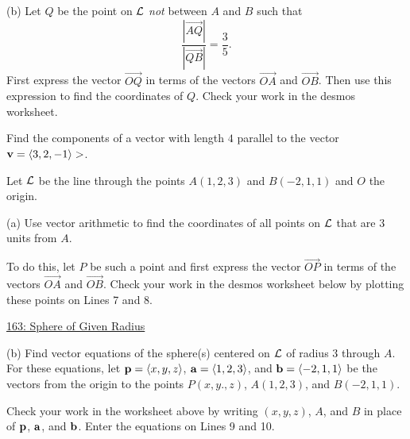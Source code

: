 \documentclass{ximera}
\begin{document}
\begin{question}
\begin{explanation}
\end{explanation}


(b) Let $Q$ be the point on ${\cal L}$ \emph{not} between $A$ and $B$ such that
\[
      \frac{|\overrightarrow{AQ}|}{|\overrightarrow{QB}|} = \frac{3}{5} . 
\]
First express the vector $\overrightarrow{OQ}$ in terms of the vectors $\overrightarrow{OA}$ and $\overrightarrow{OB}$. Then use this expression to find the coordinates of $Q$. Check your work in the desmos worksheet.


\end{question}

\begin{question}  \label{Q:98dfer3vv}
Find the components of a vector with length $4$ parallel to the vector ${\bf v}=\langle 3, 2, -1\rangle>$.
\end{question}

\begin{question}  \label{QP9erf333}
Let ${\cal L}$ be the line through the points $A(1,2,3)$ and $B(-2,1,1)$ and $O$ the origin.

(a) Use vector arithmetic to find the coordinates of all points on ${\cal L}$ that are $3$ units from $A$. 

To do this, let $P$ be such a point and first express the vector $\overrightarrow{OP}$ in terms of the vectors $\overrightarrow{OA}$ and $\overrightarrow{OB}$. Check your work in the desmos worksheet below by plotting these points on Lines 7 and 8.

\begin{onlineOnly}
    \begin{center}
\end{center}
\end{onlineOnly}

\href{https://www.desmos.com/3d/dxn6mfy9mq}{163: Sphere of Given Radius}

(b) Find vector equations of the sphere(s) centered on ${\cal L}$ of radius $3$ through $A$. For these equations, let ${\bf p}=\langle x,y,z \rangle$, ${\bf a} = \langle 1,2,3 \rangle$, and ${\bf b} = \langle -2,1,1 \rangle$ be the vectors from the origin to the points $P(x,y.,z)$, $A(1,2,3)$, and $B(-2,1,1)$. 

Check  your work in the worksheet above by writing $(x,y,z)$, $A$, and $B$ in place of ${\bf p}$, ${\bf a}$, and ${\bf b}$. Enter the equations on Lines 9 and 10.



\end{question}
\end{document}

